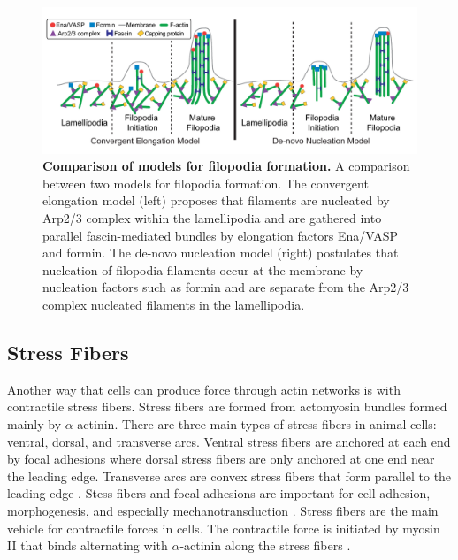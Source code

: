 \begin{figure}
\centering
\includegraphics[width=\textwidth]{img/ch01/filopodia_comparison_thesis.pdf}
\caption[Comparison of models for filopodia formation.]{\textbf{Comparison of models for filopodia formation.} A comparison between two models for filopodia formation. The convergent elongation model (left) proposes that filaments are nucleated by Arp2/3 complex within the lamellipodia and are gathered into parallel fascin-mediated bundles by elongation factors Ena/VASP and formin. The de-novo nucleation model (right) postulates that nucleation of filopodia filaments occur at the membrane by nucleation factors such as formin and are separate from the Arp2/3 complex nucleated filaments in the lamellipodia.}
\label{fig:filopodia-init}
\end{figure}

\subsection{Stress Fibers}\label{stressfibers-intro}
Another way that cells can produce force through actin networks is with contractile stress fibers. Stress fibers are formed from actomyosin bundles formed mainly by $\alpha$-actinin. There are three main types of stress fibers in animal cells: ventral, dorsal, and transverse arcs. Ventral stress fibers are anchored at each end by focal adhesions where dorsal stress fibers are only anchored at one end near the leading edge. Transverse arcs are convex stress fibers that form parallel to the leading edge \citep{burridge_focal_2016}. Stess fibers and focal adhesions are important for cell adhesion, morphogenesis, and especially mechanotransduction \citep{tojkander_actin_2012}. Stress fibers are the main vehicle for contractile forces in cells. The contractile force is initiated by myosin II that binds alternating with $\alpha$-actinin along the stress fibers \citep{naumanen_mechanisms_2008}. 

